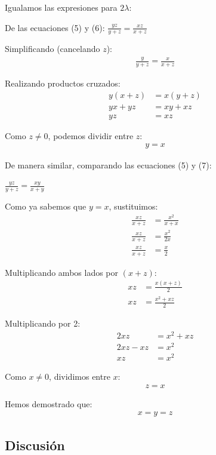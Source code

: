 \documentclass{article}
\begin{document}
Igualamos las expresiones para $2\lambda$:

De las ecuaciones (5) y (6): $\frac{yz}{y + z} = \frac{xz}{x + z}$

Simplificando (cancelando $z$):
\begin{align}
\frac{y}{y + z} = \frac{x}{x + z}
\end{align}

Realizando productos cruzados:
\begin{align}
y(x + z) &= x(y + z) \\
yx + yz &= xy + xz \\
yz &= xz
\end{align}

Como $z \neq 0$, podemos dividir entre $z$:
\begin{align}
y = x
\end{align}

De manera similar, comparando las ecuaciones (5) y (7):

$\frac{yz}{y + z} = \frac{xy}{x + y}$

Como ya sabemos que $y = x$, sustituimos:
\begin{align}
\frac{xz}{x + z} &= \frac{x^2}{x + x} \\
\frac{xz}{x + z} &= \frac{x^2}{2x} \\
\frac{xz}{x + z} &= \frac{x}{2}
\end{align}

Multiplicando ambos lados por $(x + z)$:
\begin{align}
xz &= \frac{x(x + z)}{2} \\
xz &= \frac{x^2 + xz}{2}
\end{align}

Multiplicando por 2:
\begin{align}
2xz &= x^2 + xz \\
2xz - xz &= x^2 \\
xz &= x^2
\end{align}

Como $x \neq 0$, dividimos entre $x$:
\begin{align}
z = x
\end{align}

Hemos demostrado que:
\begin{align}
x = y = z
\end{align}

\subsection{Discusión}
\end{document}
